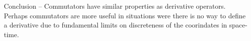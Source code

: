 Conclusion -- Commutators have similar properties as derivative operators. Perhaps commutators are more useful in situations were there is no way to define a derivative due to fundamental limits on discreteness of the coorindates in space-time.







